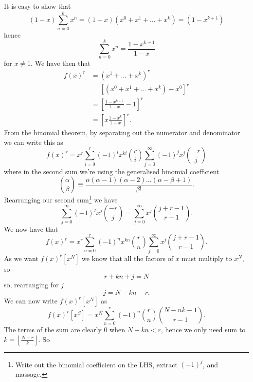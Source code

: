 \documentclass[hidelinks]{article}
\begin{document}
It is easy to show that
\begin{equation}
(1-x)\sum_{n=0}^kx^n=(1-x)(x^0+x^1+\dots+x^{k})=(1-x^{k+1})
\end{equation}
hence
\begin{equation}
\sum_{n=0}^kx^n=\frac{1-x^{k+1}}{1-x}
\end{equation}
for $x\neq1$.  We have then that
\begin{equation}
\begin{split}
f(x)^r & =(x^1+\dots+x^k)^r \\
& = \left[(x^0+x^1+\dots+x^k)-x^0\right]^r \\
& = \left[\frac{1-x^{k+1}}{1-x}-1 \right]^r  \\
& = \left[x \frac{1-x^k}{1-x} \right]^r .
\end{split}
\end{equation}
From the binomial theorem, by separating out the numerator and denominator we can write this as
\begin{equation}
f(x)^r=x^r\sum_{i=0}^r(-1)^{i}x^{ki}\binom{r}{i}\sum_{j=0}^{\infty}(-1)^jx^j\binom{-r}{j}
\end{equation}
where in the second sum we're using the generalised binomial coefficient
\begin{equation}
\binom{\alpha}{\beta}\equiv \frac{\alpha(\alpha-1)(\alpha-2)\dots(\alpha-\beta+1)}{\beta!}.
\end{equation}
Rearranging our second sum\footnote{Write out the binomial coefficient on the LHS, extract $(-1)^j$, and massage.} we have
\begin{equation}
\sum_{j=0}^{\infty}(-1)^jx^j\binom{-r}{j} = \sum_{j=0}^{\infty}x^j\binom{j+r-1}{r-1}.
\end{equation}
We now have that
\begin{equation}
f(x)^r=x^r\sum_{n=0}^r(-1)^{n}x^{kn}\binom{r}{n}\sum_{j=0}^{\infty}x^j\binom{j+r-1}{r-1}.
\end{equation}
As we want $f(x)^r[x^N]$ we know that all the factors of $x$ must multiply to $x^N$, so
\begin{equation}
	r+kn+j=N
\end{equation}
so, rearranging for $j$
\begin{equation}
j = N-kn-r.
\end{equation}
We can now write $f(x)^r[x^N]$ as
\begin{equation}
f(x)^r[x^S]=x^N\sum_{n=0}^r(-1)^{n}\binom{r}{n}\binom{N-nk-1}{r-1}.
\end{equation}
The terms of the sum are clearly $0$  when $N-kn<r$, hence we only need sum to $k=\left \lfloor{\frac{N-r}{k}}\right \rfloor$.  So
\end{document}
